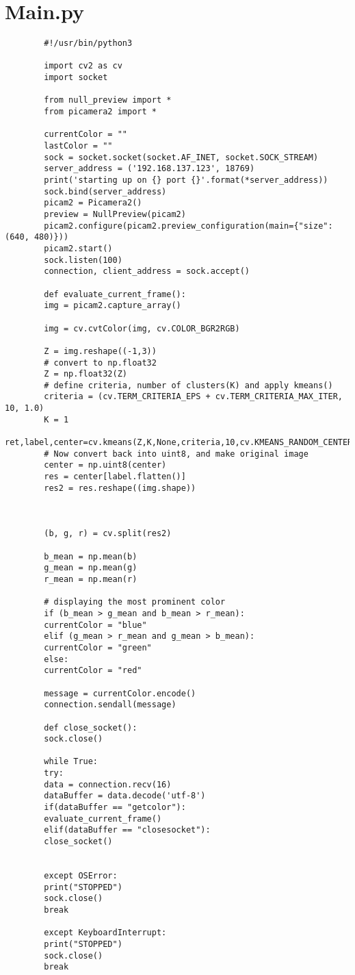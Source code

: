 \documentclass[10pt,a4paper]{report}
\begin{document}
	\section{Main.py}
	\begin{lstlisting}
		#!/usr/bin/python3
		
		import cv2 as cv
		import socket
		
		from null_preview import *
		from picamera2 import *
		
		currentColor = ""
		lastColor = ""
		sock = socket.socket(socket.AF_INET, socket.SOCK_STREAM)
		server_address = ('192.168.137.123', 18769)
		print('starting up on {} port {}'.format(*server_address))
		sock.bind(server_address)
		picam2 = Picamera2()
		preview = NullPreview(picam2)
		picam2.configure(picam2.preview_configuration(main={"size":(640, 480)}))
		picam2.start()
		sock.listen(100)
		connection, client_address = sock.accept()
		
		def evaluate_current_frame():
		img = picam2.capture_array()
		
		img = cv.cvtColor(img, cv.COLOR_BGR2RGB)
		
		Z = img.reshape((-1,3))
		# convert to np.float32
		Z = np.float32(Z)
		# define criteria, number of clusters(K) and apply kmeans()
		criteria = (cv.TERM_CRITERIA_EPS + cv.TERM_CRITERIA_MAX_ITER, 10, 1.0)
		K = 1
		ret,label,center=cv.kmeans(Z,K,None,criteria,10,cv.KMEANS_RANDOM_CENTERS)
		# Now convert back into uint8, and make original image
		center = np.uint8(center)
		res = center[label.flatten()]
		res2 = res.reshape((img.shape))
		
		
		
		(b, g, r) = cv.split(res2)
		
		b_mean = np.mean(b)
		g_mean = np.mean(g)
		r_mean = np.mean(r)
		
		# displaying the most prominent color
		if (b_mean > g_mean and b_mean > r_mean):
		currentColor = "blue"
		elif (g_mean > r_mean and g_mean > b_mean):
		currentColor = "green"
		else:
		currentColor = "red"
		
		message = currentColor.encode()
		connection.sendall(message)
		
		def close_socket():
		sock.close()
		
		while True:
		try:
		data = connection.recv(16)
		dataBuffer = data.decode('utf-8')
		if(dataBuffer == "getcolor"):
		evaluate_current_frame()
		elif(dataBuffer == "closesocket"):
		close_socket()
		
		
		except OSError:
		print("STOPPED")
		sock.close()
		break
		
		except KeyboardInterrupt:
		print("STOPPED")
		sock.close()
		break
	\end{lstlisting}
	\newpage
	
\end{document}
